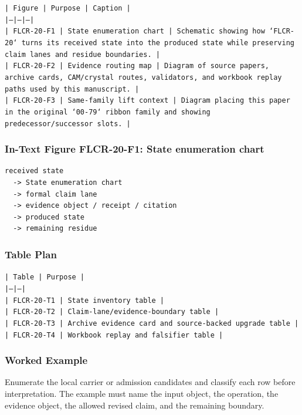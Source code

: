 \documentclass[11pt]{article}
\begin{document}
\noindent\texttt{| Figure | Purpose | Caption |}\\
\noindent\texttt{|---|---|---|}\\
\noindent\texttt{| FLCR-20-F1 | State enumeration chart | Schematic showing how `FLCR-20` turns its received state into the produced state while preserving claim lanes and residue boundaries. |}\\
\noindent\texttt{| FLCR-20-F2 | Evidence routing map | Diagram of source papers, archive cards, CAM/crystal routes, validators, and workbook replay paths used by this manuscript. |}\\
\noindent\texttt{| FLCR-20-F3 | Same-family lift context | Diagram placing this paper in the original `00-79` ribbon family and showing predecessor/successor slots. |}\\

\subsubsection*{In-Text Figure FLCR-20-F1: State enumeration chart}

\begin{verbatim}
received state
  -> State enumeration chart
  -> formal claim lane
  -> evidence object / receipt / citation
  -> produced state
  -> remaining residue
\end{verbatim}

\subsubsection*{Table Plan}

\noindent\texttt{| Table | Purpose |}\\
\noindent\texttt{|---|---|}\\
\noindent\texttt{| FLCR-20-T1 | State inventory table |}\\
\noindent\texttt{| FLCR-20-T2 | Claim-lane/evidence-boundary table |}\\
\noindent\texttt{| FLCR-20-T3 | Archive evidence card and source-backed upgrade table |}\\
\noindent\texttt{| FLCR-20-T4 | Workbook replay and falsifier table |}\\

\subsubsection*{Worked Example}

Enumerate the local carrier or admission candidates and classify each row before interpretation. The example must name the input object, the operation,
the evidence object, the allowed revised claim, and the remaining boundary.
\end{document}
